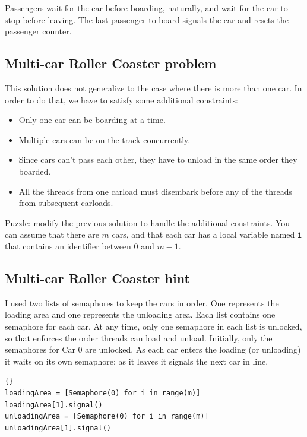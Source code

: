 \documentclass{book}
\newcommand{\clearemptydoublepage}{\newpage\cleardoublepage}
\begin{document}
Passengers wait for the car before boarding, naturally, and wait for
the car to stop before leaving.  The last passenger to board signals
the car and resets the passenger counter.


\clearemptydoublepage
\subsection{Multi-car Roller Coaster problem}

This solution does not generalize to the case where there is more
than one car.  In order to do that, we have to satisfy some additional
constraints:

\begin{itemize}

\item Only one car can be boarding at a time.

\item Multiple cars can be on the track concurrently.

\item Since cars can't pass each other, they have to unload
in the same order they boarded.

\item All the threads from one carload must disembark before
any of the threads from subsequent carloads.

\end{itemize}

Puzzle: modify
the previous solution to handle the additional constraints.
You can assume that there are $m$ cars, and that
each car has a local variable named {\tt i}
that contains an identifier between 0 and $m-1$.


\clearemptydoublepage
\subsection{Multi-car Roller Coaster hint}

I used two lists of semaphores to keep the cars in order.  One
represents the loading area and one represents the unloading area.
Each list contains one semaphore for each car.
At any time, only one semaphore in each
list is unlocked, so that enforces the order threads can
load and unload.
Initially, only the semaphores for Car 0 are unlocked.
As each car enters the
loading (or unloading) it waits on its own semaphore; as it leaves it
signals the next car in line.

\begin{latin}
\begin{latin}
\begin{lstlisting}[title={Multi-car Roller Coaster hint}]{}
loadingArea = [Semaphore(0) for i in range(m)]
loadingArea[1].signal()
unloadingArea = [Semaphore(0) for i in range(m)]
unloadingArea[1].signal()
\end{lstlisting}
\end{latin}
\end{latin}
\end{document}
